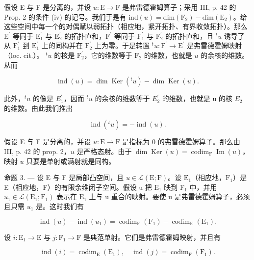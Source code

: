 假设 E 与 F 是分离的，并设 \(u\colon\mathrm{E}\to\mathrm{F}\) 是弗雷德霍姆算子；采用 III, p. 42 的 Prop. 2 的条件 (iv) 的记号。我们于是有 \(\mathrm{ind}(u)=\mathrm{dim}(\mathrm{F}_{2})-\mathrm{dim}(\mathrm{E}_{2})\)。给这些空间中每一个的对偶赋以弱拓扑（相应地，紧开拓扑、有界收敛拓扑）。那么 \(\mathrm{E}^{\prime}\) 等同于 \(\mathrm{E}_{1}^{\prime}\) 与 \(\mathrm{E}_{2}^{\prime}\) 的拓扑直和，\(\mathrm{F}^{\prime}\) 等同于 \(\mathrm{F}_{1}^{\prime}\) 与 \(\mathrm{F}_{2}^{\prime}\) 的拓扑直和，且 \(^{t}u\) 诱导了从 \(\mathrm{F}_{1}^{\prime}\) 到 \(\mathrm{E}_{1}^{\prime}\) 上的同构并在 \(\mathrm{F}_{2}^{\prime}\) 上为零。于是转置 \(^{t}u\colon\mathrm{F}^{\prime}\to\mathrm{E}^{\prime}\) 是弗雷德霍姆映射（loc. cit.）。 \(^{t}u\) 的核是 \(\mathrm{F}_{2}^{\prime}\)，它的维数等于 \(\mathrm{F}_{2}\) 的维数，也就是 \(u\) 的余核的维数。从而

\[
\operatorname{ind} (u) = \dim \operatorname{Ker} (^ {t} u) - \dim \operatorname{Ker} (u).\tag{3}
\]

此外，\(^{t}u\) 的像是 \(E_{1}^{\prime}\)，因而 \(^{t}u\) 的余核的维数等于 \(E_{2}^{\prime}\) 的维数，也就是 u 的核 \(E_{2}\) 的维数。由此我们推出

\[
\operatorname{ind} (^ {t} u) = - \operatorname{ind} (u).\tag{4}
\]

假设 E 与 F 是分离的，并设 \(u\colon\mathrm{E}\to\mathrm{F}\) 是指标为 0 的弗雷德霍姆算子。那么由 III, p. 42 的 prop. 2，\(u\) 是严格态射。由于 \(\dim\operatorname{Ker}(u)=\operatorname{codim}_{\mathrm{F}}\operatorname{Im}(u)\)，映射 \(u\) 只要是单射或满射就是同构。

命题 3. --- 设 E 与 F 是局部凸空间，且 \(u \in \mathcal{L}(\mathrm{E};\mathrm{F})\)。设 \(\mathrm{E}_{1}\)（相应地，\(\mathrm{F}_{1}\)）是 E（相应地，F）的有限余维闭子空间。假设 u 把 \(\mathrm{E}_{1}\) 映到 \(\mathrm{F}_{1}\) 中，并用 \(u_{1} \in \mathcal{L}(\mathrm{E}_{1};\mathrm{F}_{1})\) 表示在 \(\mathrm{E}_{1}\) 上与 u 重合的映射。要使 u 是弗雷德霍姆算子，必须且只需 \(u_{1}\) 是。这时我们有

\[
\operatorname{ind} (u) - \operatorname{ind} \left(u _ {1}\right) = \operatorname{codim} _ {\mathrm{F}} \left(\mathrm{F} _ {1}\right) - \operatorname{codim} _ {\mathrm{E}} \left(\mathrm{E} _ {1}\right).\tag{5}
\]

设 \(i\colon \mathrm{E}_{1}\to \mathrm{E}\) 与 \(j\colon \mathrm{F}_{1}\to \mathrm{F}\) 是典范单射。它们是弗雷德霍姆映射，并且有

\[
\operatorname{ind} (i) = \operatorname{codim} _ {\mathrm{E}} (\mathrm{E} _ {1}), \quad \operatorname{ind} (j) = \operatorname{codim} _ {\mathrm{F}} (\mathrm{F} _ {1}).
\]

